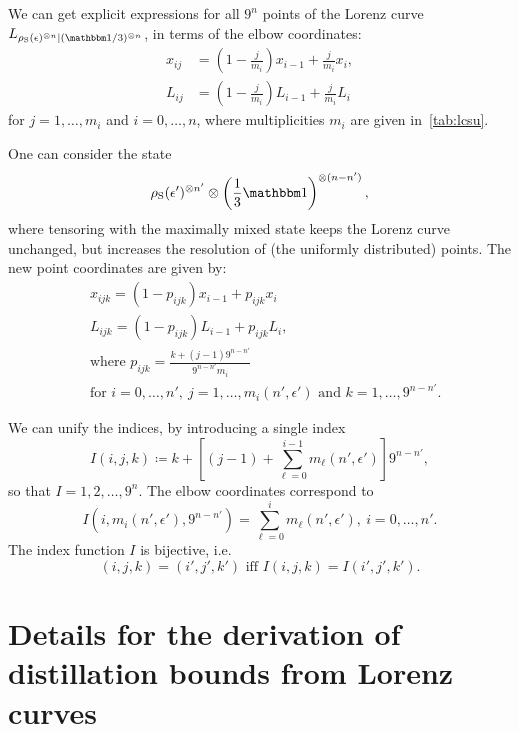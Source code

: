 \documentclass[pra,
aps,
twocolumn,
superscriptaddress,
groupedaddress,
nofootinbib,
reprint
]{revtex4-1}
\begin{document}
We can get explicit expressions for all $9^{n}$ points of the Lorenz curve $\lc{\rho_{\rm{S}}(\epsilon)^{\otimes n}}{(\id/3)^{\otimes n}}$, in terms of the elbow coordinates:
\begin{align}
    x_{ij} &= \left( 1-\frac{j}{m_{i}} \right) x_{i-1} + \frac{j}{m_{i}} x_{i}, \label{eq:x}\\
    L_{ij} &= \left( 1-\frac{j}{m_{i}} \right) L_{i-1} + \frac{j}{m_{i}} L_{i} \label{eq:l}
\end{align}
for $j = 1,\dots,m_{i}$ and $i=0,\dots,n$, where multiplicities $m_i$ are given in~\cref{tab:lcsu}.

One can consider the state 
\begin{equation*}
\rho_{\rm{S}}(\epsilon')^{\otimes n'} \otimes \left( \frac{1}{3}\id \right)^{\otimes (n-n')},
\end{equation*}
where tensoring with the maximally mixed state keeps the Lorenz curve unchanged, but increases the resolution of (the uniformly distributed) points.
The new point coordinates are given by:
\begin{align}
    &x_{ijk} = \left( 1-p_{ijk}\right) x_{i-1} + p_{ijk} x_{i} \label{eq:lcsu_xcoord}\\
    &L_{ijk} = \left( 1-p_{ijk} \right) L_{i-1} + p_{ijk} L_{i}, \label{eq:lcsu_lcoord}\\
    &\text{where } p_{ijk} = \frac{k + (j-1)9^{n-n'}}{9^{n-n'} m_{i}} \nonumber\\
    &\text{for } i=0,\dots,n',\ j = 1,\dots,m_{i}(n', \epsilon') \text{ and } k = 1,\dots,9^{n-n'}. \nonumber
\end{align}

We can unify the indices, by introducing a single index
\begin{equation}
    I(i,j,k) \coloneqq k + \left[ (j-1) + \sum_{\ell=0}^{i-1} m_{\ell}(n', \epsilon') \right]9^{n-n'},
\end{equation}
so that $I=1,2,\dots, 9^{n}$.
The elbow coordinates correspond to 
\begin{equation}
	I(i, m_{i}(n', \epsilon'), 9^{n-n'}) = \sum_{\ell=0}^{i} m_{\ell}(n', \epsilon'),\ i= 0,\dots,n'.
\end{equation}
The index function $I$ is bijective, i.e.
\begin{equation}
	(i,j,k) = (i',j',k') \text{ iff } I(i,j,k) = I(i',j',k').
\end{equation}


\section{Details for the derivation of distillation bounds from Lorenz curves}
\label{app:lcst_technical}
\end{document}
